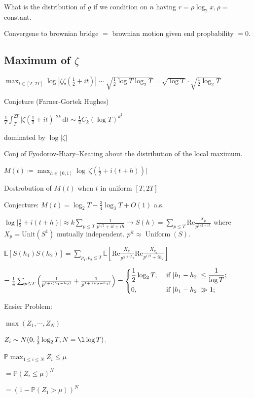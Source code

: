 \documentclass{article}
\theoremstyle{definition}
\begin{document}
    What is the distribution of \(g\) if we condition on \(n\) having \(r= \rho \log_2 x, \rho =\) constant.
    
    Convergene to brownian bridge \(=\) brownian motion given end propbability \(= 0\).

    \subsection*{Maximum of \(\zeta\)}

    \(\max_{t\in [T,2T]} \log  \left\vert \zeta \zeta (\frac{1}{2} + it) \right\vert \sim \sqrt{\frac{1}{2} \log T \log_2 T} = \sqrt{\log T} \cdot \sqrt{\frac{1}{2} \log_2 T}   \) 

    Conjeture (Farner-Gortek Hughes)

    \(\frac{1}{T} \int_{T}^{2T} \vert \zeta(\frac{1}{2} + it) \vert^{2k}  \,\mathrm{d}t \sim \frac{1}{2}C_k(\log T)^{k^2} \)

    dominated by \(\log \vert \zeta \vert \) 

    Conj of Fyodorov-Hiary--Keating about the distribution of the local maximum.

    \(M(t) \coloneqq \max_{h\in [0,1]} \log \vert \zeta(\frac{1}{2} + i(t+h) ) \vert \) 

    Dostrobution of \(M(t)\) when \(t\) in uniform \([T,2T]\)

    Conjecture: \(M(t) = \log_2 T - \frac{3}{4} \log_3 T + O(1)\) a.s.
    
    \(\log \vert \frac{1}{2} + i(t+h) \vert \approx k \sum_{p \leq T} \frac{1}{p^{1 / 2} + it + ih} \to S(h) = \sum_{p \leq T} \text{Re} \frac{X_p}{p^{1 / 2 + ih}} \) where \(X_p = \text{Unit}(S^1)\) mutually independent. \(p^{it} \approx \operatorname{Uniform}(S)\).
    
    \(\mathbb{E} [S(h_1)S(h_2)] = \sum_{p_1, p_2 \leq T} \mathbb{E} \left[ \text{Re} \frac{X_{p_1}}{p^{\frac{1}{2} + ih_1}} \text{Re} \frac{X_{p_2}}{p^{1 / 2} + ih_2} \right]  \) 

    \(= \frac{1}{4} \sum_{p \leq T} \left( \frac{1}{p^{1+i(h_1 - h_2)}} + \frac{1}{p^{1+i(h_2 - h_1)}} \right) = \begin{dcases}
        \frac{1}{2} \log_2 T, &\text{ if } \vert h_1 - h_2 \vert \leq \frac{1}{\log T} ;\\
        0, &\text{ if } \vert h_1 - h_2 \vert \gg 1  ;\end{dcases}\) 


    Easier Problem:

    \(\max (Z_1, \cdots ,Z_N)\)
    
    \(Z_i \sim N(0, \frac{1}{2} \log_2 T, N = \l \log T)\).
    
    \(\mathbb{P} \max_{1 \leq i \leq N} Z_i \leq \mu\)
    
    \(= \mathbb{P} (Z_i \leq \mu)^N\) 

    \(= \left( 1 - \mathbb{P} (Z_1 > \mu) \right)^N \) 
\end{document}
